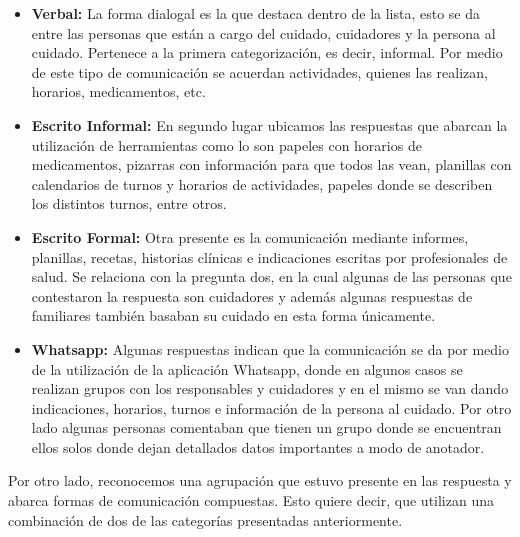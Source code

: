 \documentclass[a4paper,12pt]{article}
\begin{document}
    \begin{itemize}
        \item \textbf{Verbal:} La forma dialogal es la que destaca dentro de la lista, esto se da entre las personas que están a cargo del cuidado, cuidadores y la persona al cuidado. Pertenece a la primera categorización, es decir, informal. Por medio de este tipo de comunicación se acuerdan actividades, quienes las realizan, horarios, medicamentos, etc.
        \item \textbf{Escrito Informal:} En segundo lugar ubicamos las respuestas que abarcan la utilización de herramientas como lo son papeles con horarios de medicamentos, pizarras con información para que todos las vean, planillas con calendarios de turnos y horarios de actividades, papeles donde se describen los distintos turnos, entre otros.
        \item \textbf{Escrito Formal:} Otra presente es la comunicación mediante informes, planillas, recetas, historias clínicas e indicaciones escritas por profesionales de salud. Se relaciona con la pregunta dos, en la cual algunas de las personas que contestaron la respuesta son cuidadores y además algunas respuestas de familiares también basaban su cuidado en esta forma únicamente.
        \item \textbf{Whatsapp:} Algunas respuestas indican que la comunicación se da por medio de la utilización de la aplicación Whatsapp, donde en algunos casos se realizan grupos con los responsables y cuidadores y en el mismo se van dando indicaciones, horarios, turnos e información de la persona al cuidado. Por otro lado algunas personas comentaban que tienen un grupo donde se encuentran ellos solos donde dejan detallados datos importantes a modo de anotador.
    \end{itemize}
    \par Por otro lado, reconocemos una agrupación que estuvo presente en las respuesta y abarca formas de comunicación compuestas. Esto quiere decir, que utilizan una combinación de dos de las categorías presentadas anteriormente.
\end{document}
